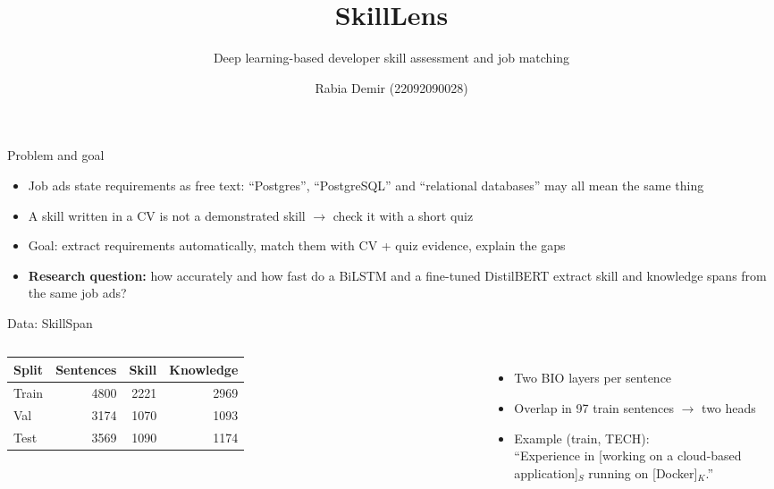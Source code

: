 \documentclass[aspectratio=169,11pt]{beamer}
\title{SkillLens}
\subtitle{Deep learning-based developer skill assessment and job matching}
\author{Rabia Demir (22092090028)}
\institute{\yaz{Ders, Bölüm, Üniversite}}
\date{\yaz{Tarih}}
\begin{document}
\begin{frame}
\titlepage
\end{frame}

\begin{frame}{Problem and goal}
\begin{itemize}
  \item Job ads state requirements as free text: ``Postgres'', ``PostgreSQL'' and ``relational
        databases'' may all mean the same thing
  \item A skill written in a CV is not a demonstrated skill $\rightarrow$ check it with a short quiz
  \item Goal: extract requirements automatically, match them with CV + quiz evidence, explain the gaps
  \item \textbf{Research question:} how accurately and how fast do a BiLSTM and a fine-tuned
        DistilBERT extract skill and knowledge spans from the same job ads?
\end{itemize}
\end{frame}

\begin{frame}{Data: SkillSpan}
\begin{columns}[T]
\small
\begin{tabular}{lrrr}
\toprule
Split & Sentences & Skill & Knowledge \\
\midrule
Train & 4800 & 2221 & 2969 \\
Val & 3174 & 1070 & 1093 \\
Test & 3569 & 1090 & 1174 \\
\bottomrule
\end{tabular}
\begin{itemize}
  \item Two BIO layers per sentence
  \item Overlap in 97 train sentences $\rightarrow$ two heads
  \item Example (train, TECH):\\ {\small ``Experience in \textcolor{orange!80!black}{[working on a cloud-based
        application]$_{S}$} running on \textcolor{blue!70!black}{[Docker]$_{K}$}.''}
\end{itemize}
\end{columns}
\end{frame}
\end{document}
